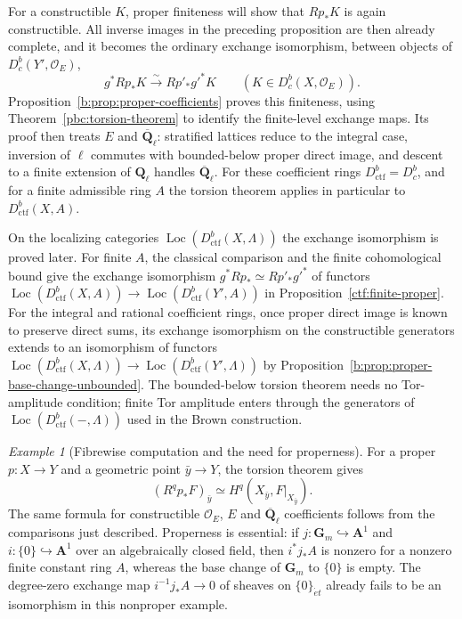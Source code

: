\documentclass[11pt,a4paper]{article}
\numberwithin{equation}{section}
\theoremstyle{definition}
\theoremstyle{remark}
\newcommand{\Dbc}{D^b_c}
\newcommand{\Loc}{\operatorname{Loc}}
\newcommand{\Qbar}{\overline{\mathbf Q}_\ell}
\newcommand{\Ql}{\mathbf Q_\ell}
\newcommand{\et}{\acute{e}t}
\newcommand{\Dctf}{D^b_{\mathrm{ctf}}}
\newtheorem{example}[theorem]{Example}
\begin{document}
For a constructible $K$, proper finiteness will show that $Rp_*K$ is
again constructible. All inverse images in the preceding proposition
are then already complete, and it becomes the ordinary exchange
isomorphism, between objects of $\Dbc(Y',\mathcal O_E)$,
\[
 g^*Rp_*K\xrightarrow{\sim}Rp'_*g'^*K
 \qquad(K\in\Dbc(X,\mathcal O_E)).
\]
Proposition~\ref{b:prop:proper-coefficients} proves this finiteness,
using Theorem~\ref{pbc:torsion-theorem} to identify the finite-level
exchange maps. Its proof then treats $E$ and $\Qbar$: stratified
lattices reduce to the integral case, inversion of $\ell$ commutes
with bounded-below proper direct image, and descent to a finite
extension of $\Ql$ handles $\Qbar$. For these coefficient rings
$\Dctf=\Dbc$, and for a finite admissible ring $A$ the torsion theorem
applies in particular to $\Dctf(X,A)$.

On the localizing categories $\Loc(\Dctf(X,\Lambda))$ the exchange
isomorphism is proved later. For finite $A$, the classical comparison
and the finite cohomological bound give the exchange isomorphism
$g^*Rp_*\simeq Rp'_*g'^*$ of functors
$\Loc(\Dctf(X,A))\to\Loc(\Dctf(Y',A))$ in
Proposition~\ref{ctf:finite-proper}. For the integral
and rational coefficient rings, once proper direct image is known to
preserve direct sums, its exchange isomorphism on the constructible
generators extends to an isomorphism of functors
$\Loc(\Dctf(X,\Lambda))\to\Loc(\Dctf(Y',\Lambda))$ by
Proposition~\ref{b:prop:proper-base-change-unbounded}. The bounded-below
torsion theorem needs no Tor-amplitude condition; finite Tor amplitude
enters through the generators of $\Loc(\Dctf(-,\Lambda))$ used in the Brown
construction.

\begin{example}[Fibrewise computation and the need for properness]
For a proper $p:X\to Y$ and a geometric point $\bar y\to Y$, the
torsion theorem gives
\[
 (R^qp_*F)_{\bar y}\simeq H^q(X_{\bar y},F|_{X_{\bar y}}).
\]
The same formula for constructible $\mathcal O_E$, $E$ and $\Qbar$
coefficients follows from the comparisons just described. Properness
is essential: if
$j:\mathbf G_m\hookrightarrow\mathbf A^1$ and $i:\{0\}\hookrightarrow
\mathbf A^1$ over an algebraically closed field, then
$i^*j_*A$ is nonzero for a nonzero finite constant ring $A$, whereas
the base change of $\mathbf G_m$ to $\{0\}$ is empty. The degree-zero
exchange map $i^{-1}j_*A\to0$ of sheaves on $\{0\}_{\et}$ already fails to be an isomorphism in this nonproper
example.
\end{example}
\end{document}
